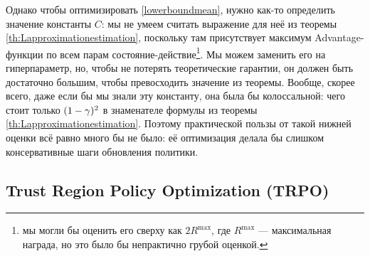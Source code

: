 Однако чтобы оптимизировать \eqref{lowerboundmean}, нужно как-то определить значение константы $C$: мы не умеем считать выражение для неё из теоремы \ref{th:Lapproximationestimation}, поскольку там присутствует максимум Advantage-функции по всем парам состояние-действие\footnote{мы могли бы оценить его сверху как $2R^{\max}$, где $R^{\max}$ --- максимальная награда, но это было бы непрактично грубой оценкой.}. Мы можем заменить его на гиперпараметр, но, чтобы не потерять теоретические гарантии, он должен быть достаточно большим, чтобы превосходить значение из теоремы. Вообще, скорее всего, даже если бы мы знали эту константу, она была бы колоссальной: чего стоит только $(1 \HM- \gamma)^2$ в знаменателе формулы из теоремы \ref{th:Lapproximationestimation}. Поэтому практической пользы от такой нижней оценки всё равно много бы не было: её оптимизация делала бы слишком консервативные шаги обновления политики.





\subsection{Trust Region Policy Optimization (TRPO)}

